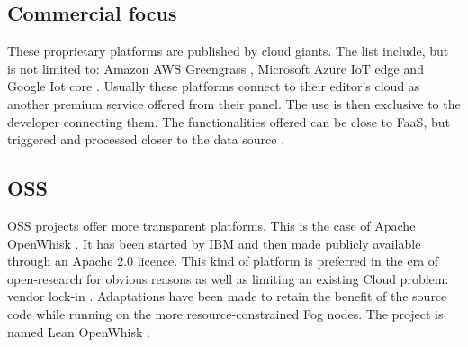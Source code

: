 \documentclass[11pt]{sdm}
\begin{document}

\subsection{Commercial focus}

These proprietary platforms are published by cloud giants. The list include, but is not limited to: Amazon AWS Greengrass \cite{noauthor_aws_nodate}, Microsoft Azure IoT edge \cite{noauthor_iot_nodate} and Google Iot core \cite{noauthor_cloud_nodate}. Usually these platforms connect to their editor's cloud as another premium service offered from their panel. The use is then exclusive to the developer connecting them. The functionalities offered can be close to \gls{FaaS}, but triggered and processed closer to the data source \cite{elgamal_costless_2018}.

%    

\hypersetup{linkcolor=}
\subsection{\acrfull{OSS}}
\gls{OSS} projects offer more transparent platforms. This is the case of Apache OpenWhisk \cite{noauthor_apache_nodate}. It has been started by IBM and then made publicly available through an Apache 2.0 licence. This kind of platform is preferred in the era of open-research for obvious reasons as well as limiting an existing Cloud problem: vendor lock-in \cite{kjorveziroski_iot_2021}. Adaptations have been made to retain the benefit of the source code while running on the more resource-constrained Fog nodes. The project is named Lean OpenWhisk \cite{breitgand_lean_2018}.
\end{document}
